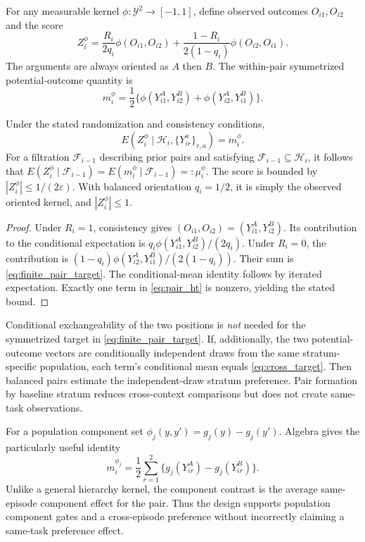 For any measurable kernel $\phi:\mathcal Y^2\to[-1,1]$, define observed
outcomes $O_{i1},O_{i2}$ and the score
\begin{equation}
 Z_i^\phi=
 \frac{R_i}{2q_i}\phi(O_{i1},O_{i2})+
 \frac{1-R_i}{2(1-q_i)}\phi(O_{i2},O_{i1}).
 \label{eq:pair_ht}
\end{equation}
The arguments are always oriented as $A$ then $B$. The within-pair
symmetrized potential-outcome quantity is
\begin{equation}
 m_i^\phi=\frac12\{
 \phi(Y_{i1}^A,Y_{i2}^B)+\phi(Y_{i2}^A,Y_{i1}^B)\}.
 \label{eq:finite_pair_target}
\end{equation}

\begin{theorem}\label{thm:pair_id}
Under the stated randomization and consistency conditions,
\[
 E(Z_i^\phi\mid\mathcal H_i,\{Y_{ir}^a\}_{r,a})=m_i^\phi.
\]
For a filtration $\mathcal F_{i-1}$ describing prior pairs and satisfying
$\mathcal F_{i-1}\subseteq\mathcal H_i$, it follows that
$E(Z_i^\phi\mid\mathcal F_{i-1})
=E(m_i^\phi\mid\mathcal F_{i-1})=:\mu_i^\phi$.
The score is bounded by $|Z_i^\phi|\leq1/(2\varepsilon)$.
With balanced orientation $q_i=1/2$, it is simply the observed oriented
kernel, and $|Z_i^\phi|\leq1$.
\end{theorem}
\begin{proof}
Under $R_i=1$, consistency gives
$(O_{i1},O_{i2})=(Y_{i1}^A,Y_{i2}^B)$. Its contribution to the
conditional expectation is
$q_i\phi(Y_{i1}^A,Y_{i2}^B)/(2q_i)$.
Under $R_i=0$, the contribution is
$(1-q_i)\phi(Y_{i2}^A,Y_{i1}^B)/(2(1-q_i))$.
Their sum is \eqref{eq:finite_pair_target}. The conditional-mean identity
follows by iterated expectation. Exactly one term in
\eqref{eq:pair_ht} is nonzero, yielding the stated bound.
\end{proof}

Conditional exchangeability of the two positions is \emph{not} needed
for the symmetrized target in \eqref{eq:finite_pair_target}. If,
additionally, the two potential-outcome vectors are conditionally
independent draws from the same stratum-specific population, each term's
conditional mean equals \eqref{eq:cross_target}. Then balanced pairs
estimate the independent-draw stratum preference. Pair formation by
baseline stratum reduces cross-context comparisons but does not create
same-task observations.

For a population component set
$\phi_j(y,y')=g_j(y)-g_j(y')$. Algebra gives the particularly useful
identity
\begin{equation}
 m_i^{\phi_j}=
 \frac12\sum_{r=1}^2\{g_j(Y_{ir}^A)-g_j(Y_{ir}^B)\}.
 \label{eq:component_pair_effect}
\end{equation}
Unlike a general hierarchy kernel, the component contrast is the
average same-episode component effect for the pair. Thus the design
supports population component gates and a cross-episode preference
without incorrectly claiming a same-task preference effect.

